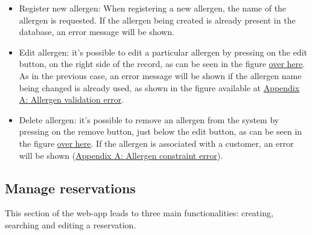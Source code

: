 \documentclass{article}
\begin{document}
    \begin{itemize}

        \item Register new allergen: When registering a new allergen, the name of the allergen is requested. If the allergen being created is already present in the database, an error message will be shown.

        \item Edit allergen: it's possible
        to edit a particular allergen by pressing on the edit button, on the right side of the record, as can be seen in the figure \hyperref[fig:allergens_overview]{over here}. As in the previous case, an error message will be shown if the allergen name being changed is already used, as shown in the figure available at \hyperref[fig:allergen_validation_error]{Appendix A: Allergen validation error}.

        \item Delete allergen: it's possible
        to remove an allergen from the system by pressing on the remove button, just below the edit button, as can be seen in the figure \hyperref[fig:allergens_overview]{over here}. If the allergen is associated with a customer, an error will be shown (\hyperref[fig:allergen_constraint_error]{Appendix A: Allergen constraint error}).

    \end{itemize}

    \subsection*{Manage reservations}
    This section of the web-app leads to three main functionalities: creating, searching
    and editing a reservation.
\end{document}
